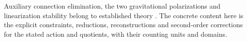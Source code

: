 Auxiliary connection elimination, the two gravitational polarizations and linearization stability belong to established theory \cite{Hehl1976,Pons2010,BrillDeser1973,ArmsMarsdenMoncrief1982,FischerMarsdenMoncrief1980}. The concrete content here is the explicit constraints, reductions, reconstructions and second-order corrections for the stated action and quotients, with their counting units and domains.

